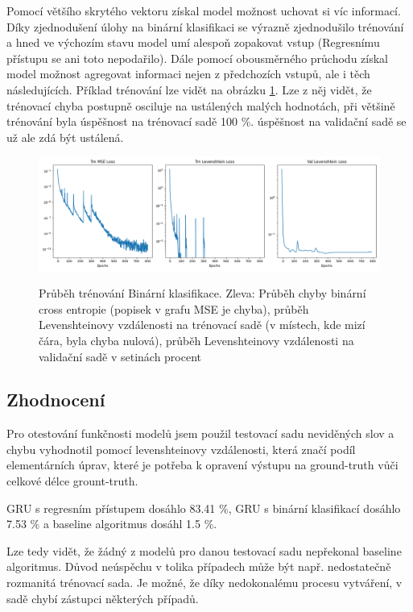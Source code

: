 \documentclass[a4paper]{article}
\theoremstyle{definition}
\begin{document}
Pomocí většího skrytého vektoru získal model možnost uchovat si víc informací. Díky zjednodušení úlohy na binární klasifikaci se výrazně zjednodušilo trénování a hned ve výchozím stavu model umí alespoň zopakovat vstup (Regresnímu přístupu se ani toto nepodařilo). Dále pomocí obousměrného průchodu získal model možnost agregovat informaci nejen z předchozích vstupů, ale i těch následujících. Příklad trénování lze vidět na obrázku \ref{png:graf_trenovani_new_gru}. Lze z něj vidět, že trénovací chyba postupně osciluje na ustálených malých hodnotách, při většině trénování byla úspěšnost na trénovací sadě 100 \%. úspěšnost na validační sadě se už ale zdá být ustálená.

\begin{figure}[t!]
  \centering
  \includegraphics[width=4.5in]{docs/torch_gru_256hid_2layers_bidirectional_yesbias_250batch_800epochs.png}\\[1pt]  %
  \caption{Průběh trénování Binární klasifikace. Zleva: Průběh chyby binární cross entropie (popisek v grafu MSE je chyba), průběh Levenshteinovy vzdálenosti na trénovací sadě (v místech, kde mizí čára, byla chyba nulová), průběh Levenshteinovy vzdálenosti na validační sadě v setinách procent}
  \label{png:graf_trenovani_new_gru}
\end{figure}

\subsection{Zhodnocení}
\label{subsec:zhodnoceni}

Pro otestování funkčnosti modelů jsem použil testovací sadu neviděných slov a chybu vyhodnotil pomocí levenshteinovy vzdálenosti, která značí podíl elementárních úprav, které je potřeba k opravení výstupu na ground-truth vůči celkové délce grount-truth.

GRU s regresním přístupem dosáhlo 83.41 \%, GRU s binární klasifikací dosáhlo 7.53 \% a baseline algoritmus dosáhl 1.5 \%. 

Lze tedy vidět, že žádný z modelů pro danou testovací sadu nepřekonal baseline algoritmus.
Důvod neúspěchu v tolika případech může být např. nedostatečně rozmanitá trénovací sada. Je možné, že díky nedokonalému procesu vytváření, v sadě chybí zástupci některých případů.
\end{document}
